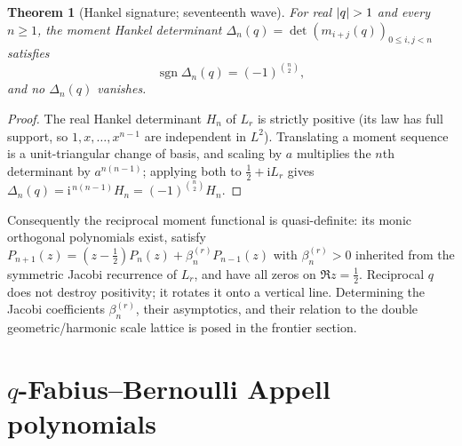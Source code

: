 \documentclass[11pt,oneside]{article}
\numberwithin{equation}{section}
\newtheorem{theorem}{Theorem}[section]
\theoremstyle{definition}
\theoremstyle{remark}
\newcommand{\sgn}{\operatorname{sgn}}
\newcommand{\ii}{\mathrm i}
\begin{document}
\begin{theorem}[Hankel signature; seventeenth wave]
\label{p7:thm:hankel}
For real $\left\lvert q\right\rvert>1$ and every $n\ge1$, the moment Hankel determinant
$\Delta_n(q)=\det(m_{i+j}(q))_{0\le i,j<n}$ satisfies
\begin{equation}\label{p7:eq:hankel-signature}
 \boxed{\ \sgn\Delta_n(q)=(-1)^{\binom n2},\ }
\end{equation}
and no $\Delta_n(q)$ vanishes.
\end{theorem}

\begin{proof}
The real Hankel determinant $H_n$ of $L_r$ is strictly positive (its law has
full support, so $1,x,\ldots,x^{n-1}$ are independent in $L^2$).  Translating
a moment sequence is a unit-triangular change of basis, and scaling by $a$
multiplies the $n$th determinant by $a^{n(n-1)}$; applying both to
$\tfrac12+\ii L_r$ gives $\Delta_n(q)=\ii^{\,n(n-1)}H_n=(-1)^{\binom n2}H_n$.
\end{proof}

Consequently the reciprocal moment functional is quasi-definite: its monic
orthogonal polynomials exist, satisfy
$P_{n+1}(z)=(z-\tfrac12)P_n(z)+\beta_n^{(r)}P_{n-1}(z)$ with
$\beta_n^{(r)}>0$ inherited from the symmetric Jacobi recurrence of $L_r$, and
have all zeros on $\Re z=\tfrac12$.  Reciprocal $q$ does not destroy
positivity; it rotates it onto a vertical line.  Determining the Jacobi
coefficients $\beta_n^{(r)}$, their asymptotics, and their relation to the
double geometric/harmonic scale lattice is posed in the frontier section.

\section{\texorpdfstring{$q$}{q}-Fabius--Bernoulli Appell polynomials}
\label{p7:sec:appell}
\end{document}
